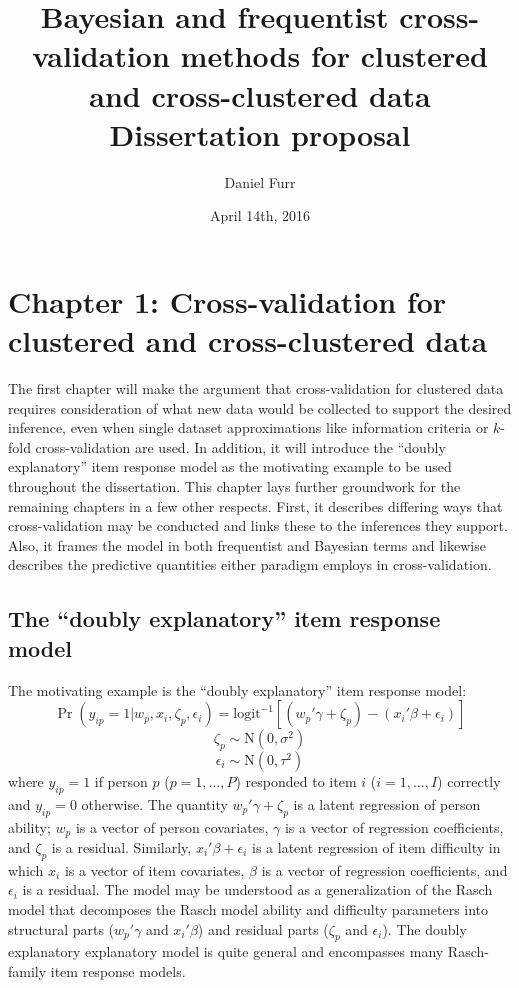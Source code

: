 \documentclass[letterpaper]{article}
\title{Bayesian and frequentist cross-validation methods for clustered and cross-clustered data \\ \large{Dissertation proposal} }
\author{Daniel Furr}
\date{April 14th, 2016}
\begin{document}
\maketitle


\section{Chapter 1: Cross-validation for clustered and cross-clustered data}

The first chapter will make the argument that cross-validation for clustered data requires consideration of what new data would be collected to support the desired inference, even when single dataset approximations like information criteria or $k$-fold cross-validation are used. 
In addition, it will introduce the ``doubly explanatory'' item response model as the motivating example to be used throughout the dissertation.
This chapter lays further groundwork for the remaining chapters in a few other respects. First, it describes differing ways that cross-validation may be conducted and links these to
the inferences they support. Also, it frames the model in both frequentist and Bayesian terms and likewise describes the predictive quantities either paradigm employs in cross-validation.


\subsection{The ``doubly explanatory'' item response model}

The motivating example is the ``doubly explanatory'' \cite{Wilson2004} item response model:
\begin{equation} \label{eq:eirm}
	\Pr(y_{ip} = 1 | w_p, x_i, \zeta_p, \epsilon_i) =
	\mathrm{logit}^{-1} \left [ (w_p'\gamma + \zeta_p) -
	                            (x_i'\beta + \epsilon_i) \right ]
\end{equation}
\begin{equation}
\zeta_p \sim \mathrm{N}(0, \sigma^2)
\end{equation}
\begin{equation}
\epsilon_i \sim \mathrm{N}(0, \tau^2)
\end{equation}
where $y_{ip} = 1$ if person $p$ ($p = 1, \dotsc, P$) responded to item $i$ ($i = 1, \dotsc, I$) correctly and $y_{ip} = 0$ otherwise. The quantity $w_p'\gamma + \zeta_p$ is a latent regression of person ability; $w_p$ is a vector of person covariates, $\gamma$ is a vector of regression coefficients, and $\zeta_p$ is a residual. Similarly, $x_i'\beta + \epsilon_i$ is a latent regression of item difficulty in which $x_i$ is a vector of item covariates, $\beta$ is a vector of regression coefficients, and $\epsilon_i$ is a residual. The model may be understood as a generalization of the Rasch model \cite{Rasch1960a} that decomposes the Rasch model ability and difficulty parameters into structural parts ($w_p'\gamma$ and $x_i'\beta$) and residual parts ($\zeta_p$ and $\epsilon_i$). The doubly explanatory explanatory model is quite general and encompasses many Rasch-family item response models.
\end{document}
